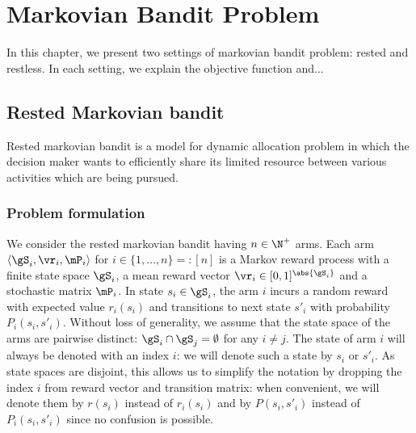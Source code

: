 \begingroup
\let\clearpage\relax

\chapter{Markovian Bandit Problem}
\label{ch:mb_problem}

In this chapter, we present two settings of markovian bandit problem: rested and restless.
In each setting, we explain the objective function and...

\section{Rested Markovian bandit}
\label{sec:rested_mab_pb}

Rested markovian bandit is a model for dynamic allocation problem in which the decision maker wants to efficiently share its limited resource between various activities which are being pursued.


\subsection{Problem formulation}
\label{subsec:rested_pb_formul}

We consider the rested markovian bandit having $n\in\N^+$ arms.
Each arm $\langle\gS_i, \vr_i, \mP_i\rangle$ for $i\in\{1,\dots,n\}=:[n]$ is a Markov reward process with a finite state space $\gS_i$, a mean reward vector $\vr_i\in[0,1]^{\abs{\gS_i}}$ and a stochastic matrix $\mP_i$.
In state $s_i\in\gS_i$, the arm $i$ incurs a random reward with expected value $r_i(s_i)$ and transitions to next state $s'_i$ with probability $P_i(s_i,s'_i)$.
Without loss of generality, we assume that the state space of the arms are pairwise distinct: $\gS_i\cap\gS_j=\emptyset$ for any $i\neq j$.
The state of arm $i$ will always be denoted with an index $i$: we will denote such a state by $s_i$ or $s'_i$.
As state spaces are disjoint, this allows us to simplify the notation by dropping the index $i$ from reward vector and transition matrix: when convenient, we will denote them by $r(s_i)$ instead of $r_i(s_i)$ and by $P(s_i,s'_i)$ instead of $P_i(s_i,s'_i)$ since no confusion is possible.


